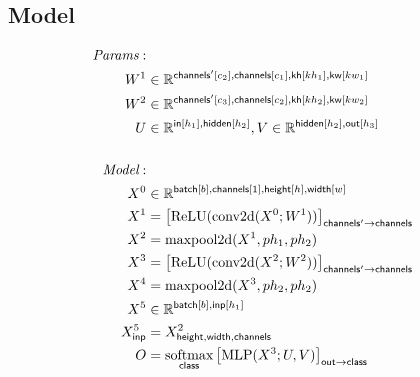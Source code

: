 \documentclass{article}
\newcommand{\reals}[0]{\mathbb{R}}
\begin{document}
\subsection*{Model}

\begin{align*} 
\textit{Params}: \\
W^1 & \in \reals^{\nset{channels'}{c_2}, \nset{channels}{c_1}, \nset{kh}{kh_1}, \nset{kw}{kw_1}} \\ 
W^2 & \in \reals^{\nset{channels'}{c_3}, \nset{channels}{c_2}, \nset{kh}{kh_2}, \nset{kw}{kw_2}} \\ 
U & \in \reals^{\nset{in}{h_1}, \nset{hidden}{h_2}},  V \in \reals^{\nset{hidden}{h_2}, \nset{out}{h_3}} \\ \\
\textit{Model}: \\
X^0 &\in \reals^{\nset{batch}{b}, \nset{channels}{1}, \nset{height}{h}, \nset{width}{w}}\\
X^1 &= \nmov{channels'}{channels}{\text{ReLU}(\text{conv2d}(X^0; W^1))} \\
X^2 &= \text{maxpool2d}(X^1, ph_1, ph_2) \\
X^3 &= \nmov{channels'}{channels}{\text{ReLU}(\text{conv2d}(X^2; W^2))} \\
X^4 &= \text{maxpool2d}(X^3, ph_2, ph_2) \\
X^5 &\in \reals^{\nset{batch}{b}, \nset{inp}{h_1}}\\ 
X^5_{\name{inp}} &= X^2_{\name{height}, \name{width}, \name{channels}}\\ 
O &= \nfun{class}{softmax} \nmov{out}{class}{\text{MLP}(X^3; U, V)}
\end{align*} 


\end{document}
